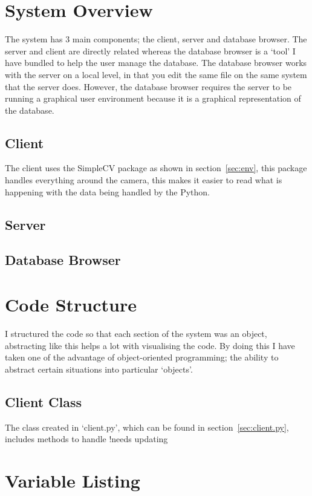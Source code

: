 \documentclass[a4paper]{article}
\begin{document}
\section{System Overview}
The system has 3 main components; the client, server and database browser. The server and client are directly related
whereas the database browser is a `tool' I have bundled to help the user manage the database. The database browser works
with the server on a local level, in that you edit the same file on the same system that the server does. However,
the database browser requires the server to be running a graphical user environment because it is a graphical representation
of the database. 

\subsection{Client}
The client uses the SimpleCV package as shown in section~\ref{sec:env}, this package handles everything around the camera,
this makes it easier to read what is happening with the data being handled by the Python.  

\subsection{Server}


\subsection{Database Browser}

\section{Code Structure}
I structured the code so that each section of the system was an object, abstracting like this helps a lot with
visualising the code. By doing this I have taken one of the advantage of object-oriented programming; the ability
to abstract certain situations into particular `objects'.

\subsection{Client Class}
The class created in `client.py', which can be found in section~\ref{sec:client.py}, includes methods to handle
!needs updating
\section{Variable Listing}
\end{document}
